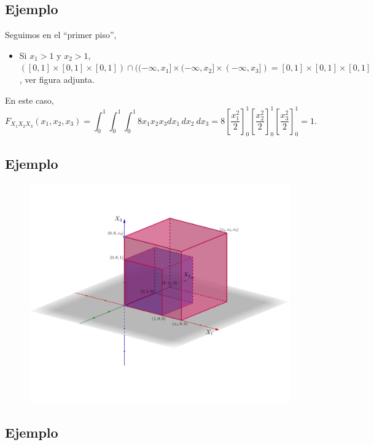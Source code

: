 \documentclass[]{book}
\providecommand{\tightlist}{%
  \setlength{\itemsep}{0pt}\setlength{\parskip}{0pt}}
\begin{document}
\hypertarget{ejemplo-111}{%
\subsection{Ejemplo}\label{ejemplo-111}}

Seguimos en el ``primer piso'',

\begin{itemize}
\tightlist
\item
  Si \(x_1>1\) y \(x_2>1\), \(([0,1]\times [0,1]\times [0,1])\cap ((-\infty,x_1]\times (-\infty,x_2]\times (-\infty,x_3])=[0,1]\times [0,1]\times [0,1]\), ver figura adjunta.
\end{itemize}

En este caso,
\[
F_{X_1X_2X_3}(x_1,x_2,x_3)=\int_{0}^{1}\int_{0}^{1}\int_{0}^{1} 8 x_1 x_2 x_3 dx_1\, dx_2\ dx_3 = 
8\left[\frac{x_1^2}{2}\right]_0^{1}\left[\frac{x_2^2}{2}\right]_0^{1}\left[\frac{x_3^2}{2}\right]_0^{1} = 1.
\]

\hypertarget{ejemplo-112}{%
\subsection{Ejemplo}\label{ejemplo-112}}

\begin{figure}
\includegraphics[width=800px]{Images/Fx1x2x3pisox1x2} \end{figure}

\hypertarget{ejemplo-113}{%
\subsection{Ejemplo}\label{ejemplo-113}}
\end{document}
